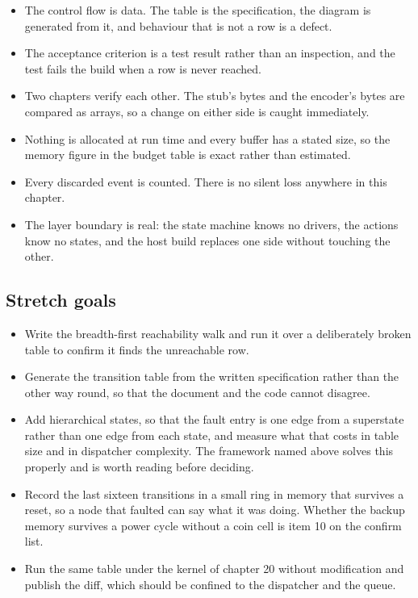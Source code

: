 \begin{itemize}
\item The control flow is data. The table is the specification, the diagram is
generated from it, and behaviour that is not a row is a defect.
\item The acceptance criterion is a test result rather than an inspection, and
the test fails the build when a row is never reached.
\item Two chapters verify each other. The stub's bytes and the encoder's bytes
are compared as arrays, so a change on either side is caught immediately.
\item Nothing is allocated at run time and every buffer has a stated size, so
the memory figure in the budget table is exact rather than estimated.
\item Every discarded event is counted. There is no silent loss anywhere in
this chapter.
\item The layer boundary is real: the state machine knows no drivers, the
actions know no states, and the host build replaces one side without touching
the other.
\end{itemize}

\subsection*{Stretch goals}

\begin{itemize}
\item Write the breadth-first reachability walk and run it over a deliberately
broken table to confirm it finds the unreachable row.
\item Generate the transition table from the written specification rather than
the other way round, so that the document and the code cannot disagree.
\item Add hierarchical states, so that the fault entry is one edge from a
superstate rather than one edge from each state, and measure what that costs in
table size and in dispatcher complexity. The framework named above solves this
properly and is worth reading before deciding.
\item Record the last sixteen transitions in a small ring in memory that
survives a reset, so a node that faulted can say what it was doing. Whether the
backup memory survives a power cycle without a coin cell is item 10 on the
confirm list.
\item Run the same table under the kernel of chapter 20 without modification
and publish the diff, which should be confined to the dispatcher and the queue.
\end{itemize}

